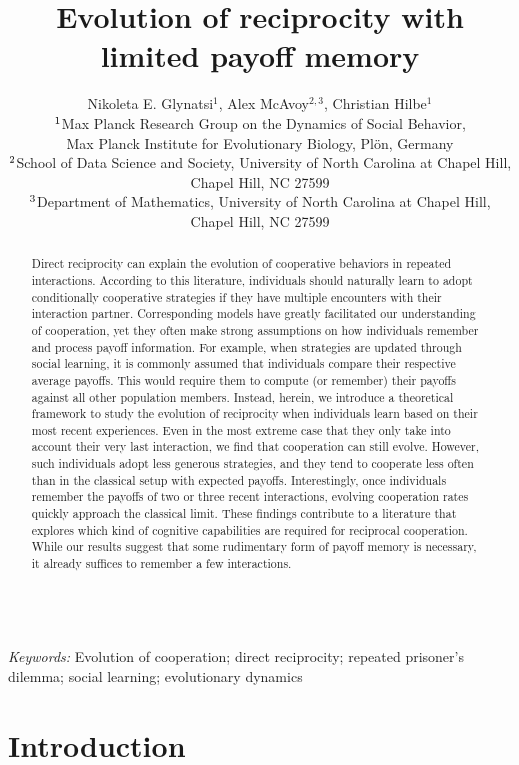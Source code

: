 \documentclass[11pt]{article}
\title{\bf  \sffamily \Large Evolution of reciprocity %
with limited payoff memory\\}
\date{}
\author{\parbox[c]{16cm}{\centering \onehalfspacing 
Nikoleta E. Glynatsi$^1$,  Alex McAvoy$^{2,3}$, Christian Hilbe$^1$\\
$^{\rm 1}$Max Planck Research Group on the Dynamics of Social Behavior,\\ Max Planck Institute for Evolutionary Biology, Pl\"{o}n, Germany \\
$^{\rm 2}$School of Data Science and Society, University of North Carolina at Chapel Hill,\\ Chapel Hill, NC 27599 \\
$^{\rm 3}$Department of Mathematics, University of North Carolina at Chapel Hill,\\ Chapel Hill, NC 27599}}
\theoremstyle{plainCl1}
\theoremstyle{plainCl2}
\begin{document}
\maketitle


\begin{abstract}
\noindent
Direct reciprocity can explain the evolution of cooperative behaviors in repeated interactions. 
According to this literature, individuals should naturally learn to adopt conditionally cooperative strategies if they have multiple encounters with their interaction partner. 
Corresponding models have greatly facilitated our understanding of cooperation, yet they often make strong assumptions on how individuals remember and process payoff information. 
For example, when strategies are updated through social learning, it is commonly assumed that individuals compare their respective average payoffs.  
This would require them to compute (or remember) their payoffs against all other population members.
Instead, herein, we introduce a theoretical framework to study the evolution of reciprocity when individuals learn based on their most recent experiences.
Even in the most extreme case that they only take into account their very last interaction, we find that cooperation can still evolve. 
However, such individuals adopt less generous strategies, and they tend to cooperate less often than in the classical setup with expected payoffs. 
Interestingly, once individuals remember the payoffs of two or three recent interactions, evolving cooperation rates quickly approach the classical limit. 
These findings contribute to a literature that explores which kind of cognitive capabilities are required for reciprocal cooperation. 
While our results suggest that some rudimentary form of payoff memory is necessary, it already suffices to remember a few interactions.\end{abstract}

~\\
{\it Keywords:} Evolution of cooperation; direct reciprocity; repeated prisoner's dilemma; social learning; evolutionary dynamics



\clearpage
\newpage



\section{Introduction}

\end{document}
